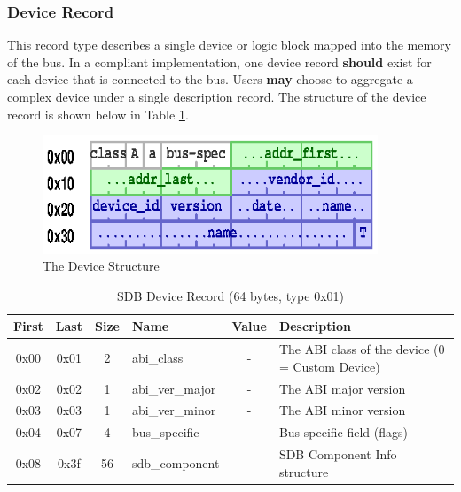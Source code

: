 \documentclass[a4paper, 12pt]{article}
\begin{document}
\pagebreak 

\subsubsection{Device Record}

This record type describes a single device or logic block mapped into the memory of the
bus. In a compliant implementation, one device record \textbf{should} exist for each device that is
connected to the bus. Users \textbf{may} choose to aggregate a complex device under a single
description record. The structure of the device record is shown below in Table
\ref{sdb_device}.

\begin{figure}[h]
\centering%
\includegraphics[width=100mm]{img/sdb-device.ps}
\caption{The Device Structure}
\label{fig:FigureDevice}
\end{figure}

\begin{center}
  \begin{savenotes}
    \begin{table}[!ht]\footnotesize
      \caption{SDB Device Record (64 bytes, type 0x01)}\label{sdb_device}\centering
        \begin{tabular}{| c | c | c | l | c | p{5cm} |} \hline
        First & Last & Size & Name & Value & Description \\ \hline
        0x00 & 0x01 & 2 & abi\_class & - & The ABI class of the device (0 = Custom Device) \\ \hline
        0x02 & 0x02 & 1 & abi\_ver\_major & - & The ABI major version \\ \hline
        0x03 & 0x03 & 1 & abi\_ver\_minor & - & The ABI minor version \\ \hline
        0x04 & 0x07 & 4 & bus\_specific & - & Bus specific field (flags) \\ \hline
        0x08 & 0x3f & 56 & sdb\_component & - & SDB Component Info structure \\ \hline
        \end{tabular}
    \end{table}
  \end{savenotes}
\end{center}
\end{document}
